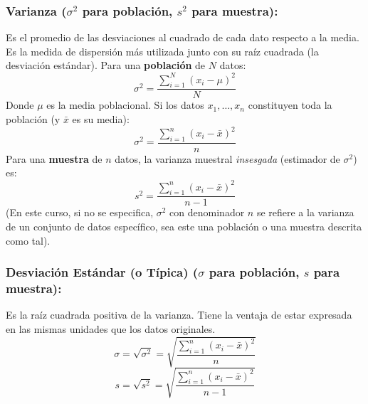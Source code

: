 \documentclass[12pt, letterpaper]{article}
\begin{document}
\subsubsection[Varianza (sigma-cuadrado para población, s-cuadrado para muestra)]{Varianza ($\sigma^2$ para población, $s^2$ para muestra):}
Es el promedio de las desviaciones al cuadrado de cada dato respecto a la media. Es la medida de dispersión más utilizada junto con su raíz cuadrada (la desviación estándar).
Para una \textbf{población} de $N$ datos:
\[ \sigma^2 = \frac{\sum_{i=1}^{N} (x_i - \mu)^2}{N} \]
Donde $\mu$ es la media poblacional. Si los datos $x_1, \dots, x_n$ constituyen toda la población (y $\bar{x}$ es su media):
\[ \sigma^2 = \frac{\sum_{i=1}^{n} (x_i - \bar{x})^2}{n} \]
Para una \textbf{muestra} de $n$ datos, la varianza muestral \textit{insesgada} (estimador de $\sigma^2$) es:
\[ s^2 = \frac{\sum_{i=1}^{n} (x_i - \bar{x})^2}{n-1} \]
(En este curso, si no se especifica, $\sigma^2$ con denominador $n$ se refiere a la varianza de un conjunto de datos específico, sea este una población o una muestra descrita como tal).

\subsubsection[Desviación Estándar (sigma para población, s para muestra)]{Desviación Estándar (o Típica) ($\sigma$ para población, $s$ para muestra):}
Es la raíz cuadrada positiva de la varianza. Tiene la ventaja de estar expresada en las mismas unidades que los datos originales.
\[ \sigma = \sqrt{\sigma^2} = \sqrt{\frac{\sum_{i=1}^{n} (x_i - \bar{x})^2}{n}} \]
\[ s = \sqrt{s^2} = \sqrt{\frac{\sum_{i=1}^{n} (x_i - \bar{x})^2}{n-1}} \]
\end{document}
